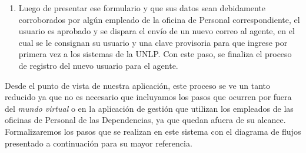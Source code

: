 \begin{enumerate}
  \item Luego de presentar ese formulario y que sus datos sean debidamente corroborados por algún empleado de la oficina de Personal correspondiente, el usuario es aprobado y se dispara el envío de un nuevo correo al agente, en el cual se le consignan su usuario y una clave provisoria para que ingrese por primera vez a los sistemas de la UNLP. Con este paso, se finaliza el proceso de registro del nuevo usuario para el agente.
\end{enumerate}

Desde el punto de vista de nuestra aplicación, este proceso se ve un tanto reducido ya que no es necesario que incluyamos los pasos que ocurren por fuera del \textit{mundo virtual} o en la aplicación de gestión que utilizan los empleados de las oficinas de Personal de las Dependencias, ya que quedan afuera de su alcance. Formalizaremos los pasos que se realizan en este sistema con el diagrama de flujos presentado a continuación para su mayor referencia.

